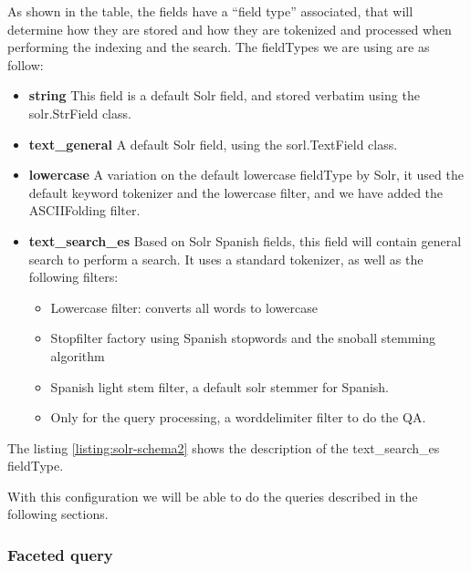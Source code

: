 As shown in the table, the fields have a ``field type'' associated, that will determine how they are stored and how they are tokenized and processed when performing the indexing and the search. The fieldTypes we are using are as follow:

\begin{itemize}
 \item \textbf{ string } This field is a default Solr field, and stored verbatim using the solr.StrField class.
 \item \textbf{ text\_general } A default Solr field, using the sorl.TextField class.
 \item \textbf{ lowercase } A variation on the default lowercase fieldType by Solr, it used the default keyword tokenizer and the lowercase filter, and we have added the ASCIIFolding filter.
 \item \textbf{ text\_search\_es } Based on Solr Spanish fields, this field will contain general search to perform a search. It uses a standard tokenizer, as well as the following filters:
 \begin{itemize}
  \item Lowercase filter: converts all words to lowercase 
  \item Stopfilter factory using Spanish stopwords and the snoball stemming algorithm
  \item Spanish light stem filter, a default solr stemmer for Spanish.
  \item Only for the query processing, a worddelimiter filter to do the QA.
 \end{itemize}
\end{itemize}

The listing \ref{listing:solr-schema2} shows the description of the text\_search\_es fieldType.

\begin{center}
  
\end{center}

With this configuration we will be able to do the queries described in the following sections.


\subsubsection{Faceted query}

